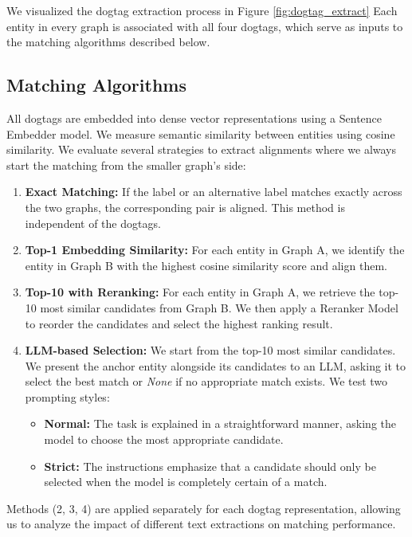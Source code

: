 \documentclass[11pt]{article}
\begin{document}
We visualized the dogtag extraction process in Figure \ref{fig:dogtag_extract}
Each entity in every graph is associated with all four dogtags, which serve as inputs to the matching algorithms described below.

\subsection{Matching Algorithms}

All dogtags are embedded into dense vector representations using a Sentence Embedder model. We measure semantic similarity between entities using cosine similarity. We evaluate several strategies to extract alignments where we always start the matching from the smaller graph's side:

\begin{enumerate}[nosep]
    \setlength\itemsep{0em}
    \setlength\parskip{0em}
    \setlength\parsep{0em}
    \item \textbf{Exact Matching:} If the label or an alternative label matches exactly across the two graphs, the corresponding pair is aligned. This method is independent of the dogtags.
    \item \textbf{Top-1 Embedding Similarity:} For each entity in Graph A, we identify the entity in Graph B with the highest cosine similarity score and align them.
    \item \textbf{Top-10 with Reranking:} For each entity in Graph A, we retrieve the top-10 most similar candidates from Graph B. We then apply a Reranker Model to reorder the candidates and select the highest ranking result.
    \item \textbf{LLM-based Selection:} We start from the top-10 most similar candidates. We present the anchor entity alongside its candidates to an LLM, asking it to select the best match or \textit{None} if no appropriate match exists. We test two prompting styles:
    \begin{itemize}
        \item \textbf{Normal:} The task is explained in a straightforward manner, asking the model to choose the most appropriate candidate.  
        \item \textbf{Strict:} The instructions emphasize that a candidate should only be selected when the model is completely certain of a match.
    \end{itemize}
\end{enumerate}

Methods (2, 3, 4) are applied separately for each dogtag representation, allowing us to analyze the impact of different text extractions on matching performance.
\end{document}
